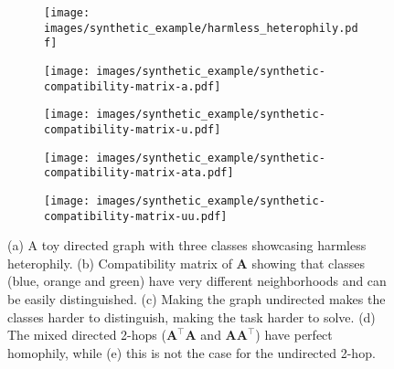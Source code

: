 \documentclass{article}
\theoremstyle{plain}
\theoremstyle{definition}
\theoremstyle{remark}
\begin{document}
\begin{figure}[t!]
\vspace{-4mm}
\centering
\begin{subfigure}[b]{0.19\textwidth}
     \centering
     \texttt{[image: images/synthetic\_example/harmless\_heterophily.pdf]}
     \caption{}
\end{subfigure}
\hfill
\begin{subfigure}[b]{0.19\textwidth}
     \centering
     \texttt{[image: images/synthetic\_example/synthetic-compatibility-matrix-a.pdf]}
     \caption{}
\end{subfigure}
\hfill
\begin{subfigure}[b]{0.19\textwidth}
     \centering
     \texttt{[image: images/synthetic\_example/synthetic-compatibility-matrix-u.pdf]}
     \caption{}
\end{subfigure}
\hfill
\begin{subfigure}[b]{0.19\textwidth}
     \centering
     \texttt{[image: images/synthetic\_example/synthetic-compatibility-matrix-ata.pdf]}
     \caption{}
\end{subfigure}
\hfill
\begin{subfigure}[b]{0.19\textwidth}
     \centering
     \texttt{[image: images/synthetic\_example/synthetic-compatibility-matrix-uu.pdf]}
     \caption{}
\end{subfigure}

\caption{(a) A toy directed graph with three classes showcasing harmless heterophily.
(b) Compatibility matrix of $\mathbf{A}$ showing that classes (blue, orange and green) have very different neighborhoods and can be easily distinguished. (c) Making the graph undirected makes the classes harder to distinguish, making the task harder to solve. 
(d) The mixed directed 2-hops ($\mathbf{A}^\top \mathbf{A}$ and $\mathbf{A} \mathbf{A}^\top$) have perfect homophily, while (e) this is not the case for the undirected 2-hop.}
\label{fig:synthetic_example}
\vspace{-5mm}
\end{figure}
\end{document}
